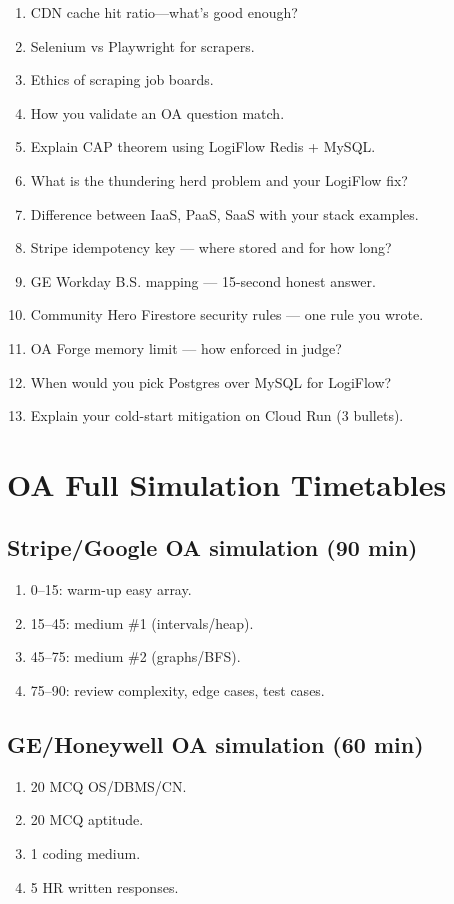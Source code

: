 \documentclass[9pt,a4paper]{article}
\begin{document}
\begin{enumerate}
  \item CDN cache hit ratio---what's good enough?
  \item Selenium vs Playwright for scrapers.
  \item Ethics of scraping job boards.
  \item How you validate an OA question match.
  \item Explain CAP theorem using LogiFlow Redis + MySQL.
  \item What is the thundering herd problem and your LogiFlow fix?
  \item Difference between IaaS, PaaS, SaaS with your stack examples.
  \item Stripe idempotency key --- where stored and for how long?
  \item GE Workday B.S. mapping --- 15-second honest answer.
  \item Community Hero Firestore security rules --- one rule you wrote.
  \item OA Forge memory limit --- how enforced in judge?
  \item When would you pick Postgres over MySQL for LogiFlow?
  \item Explain your cold-start mitigation on Cloud Run (3 bullets).
\end{enumerate}
\newpage
\section{OA Full Simulation Timetables}
\subsection{Stripe/Google OA simulation (90 min)}
\begin{enumerate}
  \item 0--15: warm-up easy array.
  \item 15--45: medium \#1 (intervals/heap).
  \item 45--75: medium \#2 (graphs/BFS).
  \item 75--90: review complexity, edge cases, test cases.
\end{enumerate}
\subsection{GE/Honeywell OA simulation (60 min)}
\begin{enumerate}
  \item 20 MCQ OS/DBMS/CN.
  \item 20 MCQ aptitude.
  \item 1 coding medium.
  \item 5 HR written responses.
\end{enumerate}
\end{document}
